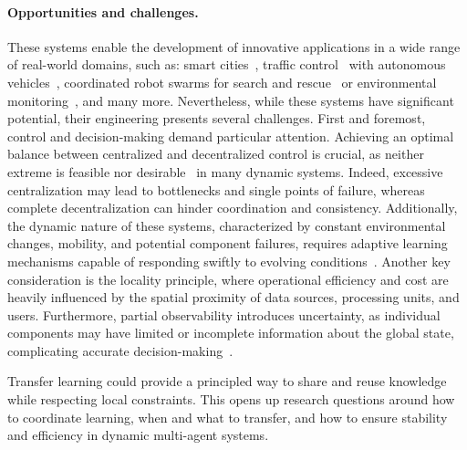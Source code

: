 \documentclass[12pt]{article}
\begin{document}
\paragraph{Opportunities and challenges.}
These systems enable the development of innovative applications in a wide range of real-world domains, such as: 
 smart cities~\cite{DBLP:conf/icse/IftikharRBW017}, 
 traffic control~\cite{DBLP:journals/tits/ChuWCL20,DBLP:books/sp/Muller2011/ProthmannTBHMS11} 
 with autonomous vehicles~\cite{DBLP:journals/corr/BojarskiTDFFGJM16}, 
 coordinated robot swarms for search and rescue~\cite{DBLP:journals/ijon/ZhouLLXS21} 
 or environmental monitoring~\cite{DBLP:conf/acsos/AguzziVE23}, and many more.
%
Nevertheless, while these systems have significant potential, their engineering 
 presents several challenges.
%
First and foremost, control and decision-making demand particular attention.
%
Achieving an optimal balance between centralized and decentralized control is crucial, 
 as neither extreme is feasible nor desirable~\cite{DBLP:conf/coordination/CasadeiPVN19,DBLP:journals/tits/ChuWCL20,DBLP:journals/jair/LyuBXDA23} 
 in many dynamic systems. 
% 
Indeed, excessive centralization may lead to bottlenecks and single points of failure, 
 whereas complete decentralization can hinder coordination and consistency.
%
Additionally, the dynamic nature of these systems, characterized by constant 
 environmental changes, mobility, and potential component failures, requires adaptive 
 learning mechanisms capable of responding swiftly 
 to evolving conditions~\cite{DBLP:journals/swarm/PrasetyoMF19}.
%
Another key consideration is the locality principle, where operational efficiency and cost 
 are heavily influenced by the spatial proximity of data sources, processing units, and users.
%
Furthermore, partial observability introduces uncertainty, as individual components may have 
 limited or incomplete information about the global state, complicating accurate 
 decision-making~\cite{DBLP:conf/uai/HeDB22}.

Transfer learning could provide a principled way to share and reuse knowledge while respecting 
 local constraints. 
%
This opens up research questions around how to coordinate learning, 
 when and what to transfer, and how to ensure stability and efficiency in dynamic 
 multi-agent systems.
\end{document}
